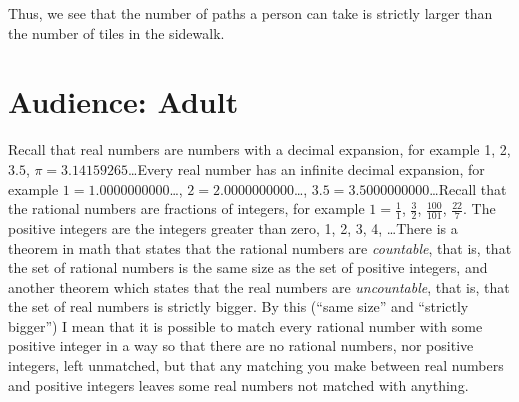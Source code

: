 \documentclass[letterpaper,11pt,showproblems]{pset}
\theoremstyle{definition} \newtheorem{defn}{Definition}[section]
\theoremstyle{definition} \newtheorem*{defn*}{Definition}
\begin{document}
  Thus, we see that the number of paths a person can take is strictly larger than the number of tiles in the sidewalk.


\clearpage
\section{Audience: Adult}
  Recall that real numbers are numbers with a decimal expansion, for example 1, 2, $3.5$, $\pi = 3.14159265$\ldots  Every real number has an infinite decimal expansion, for example $1 = 1.0000000000$\ldots, $2 = 2.0000000000$\ldots, $3.5 = 3.5000000000$\ldots  Recall that the rational numbers are fractions of integers, for example $1 = \frac11$, $\frac32$, $\frac{100}{101}$, $\frac{22}{7}$.  The positive integers are the integers greater than zero, 1, 2, 3, 4, \ldots  There is a theorem in math that states that the rational numbers are \emph{countable}, that is, that the set of rational numbers is the same size as the set of positive integers, and another theorem which states that the real numbers are \emph{uncountable}, that is, that the set of real numbers is strictly bigger.  By this (``same size'' and ``strictly bigger'') I mean that it is possible to match every rational number with some positive integer in a way so that there are no rational numbers, nor positive integers, left unmatched, but that any matching you make between real numbers and positive integers leaves some real numbers not matched with anything. 
  
\end{document}
